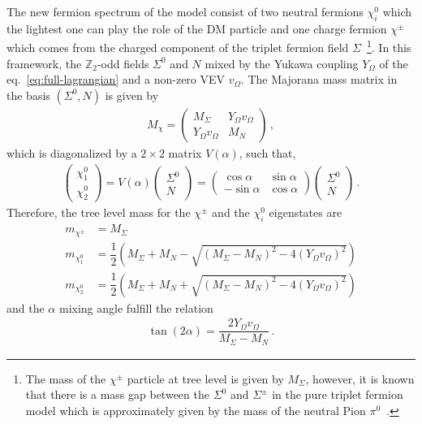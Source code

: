\documentclass[12pt,letterpaper]{article}
\begin{document}
The new fermion spectrum of the model consist of two neutral fermions $\chi_i^0$ which the lightest one can play the role of the DM particle and one charge fermion $\chi^{\pm}$ which comes from the charged component of the triplet fermion field $\Sigma$~\footnote{The mass of the $\chi^{\pm}$ particle at tree level is given by $M_{\Sigma}$, however, it is known that there is a mass gap between the $\Sigma^0$ and $\Sigma^{\pm}$ in the pure triplet fermion model which is approximately given by the mass of the neutral Pion $\pi^0$~\cite{Cirelli:2005uq, Choubey:2017yyn}.}. 
In this framework, the $\mathbb{Z}_2$-odd fields $\Sigma^0$ and $N$ mixed by the Yukawa coupling $Y_{\Omega}$ of the eq.~\ref{eq:full-lagrangian} and a non-zero VEV $v_{\Omega}$. The Majorana mass matrix in the basis $(\Sigma^0, N)$ is given by
\begin{align}
\label{eq:M-chi-matrix}
M_{\chi}=
\begin{pmatrix}
M_{\Sigma} & Y_{\Omega}v_{\Omega} \\
Y_{\Omega}v_{\Omega} & M_N
\end{pmatrix}\,,
\end{align}
which is diagonalized by a $2\times2$ matrix $V(\alpha)$, such that,
\begin{align}
\label{eq:M-chi-rotation}
\begin{pmatrix}
\chi_1^0 \\
\chi_2^0
\end{pmatrix}=
V(\alpha)
\begin{pmatrix}
\Sigma^0 \\
N
\end{pmatrix}
=
\begin{pmatrix}
\cos\alpha & \sin\alpha \\
-\sin\alpha & \cos\alpha
\end{pmatrix}
\begin{pmatrix}
\Sigma^0 \\
N
\end{pmatrix}\,.
\end{align}
Therefore, the tree level mass for the $\chi^{\pm}$ and the $\chi^0_i$ eigenstates are
\begin{align}
m_{\chi^{\pm}} &= M_\Sigma \nonumber \\
m_{\chi_1^0} &= \dfrac{1}{2}\left(M_\Sigma + M_N - \sqrt{(M_\Sigma - M_N)^2-4(Y_{\Omega}v_{\Omega})^2} \right)\nonumber \\
\label{eq:chi-masses}
m_{\chi_2^0} &= \dfrac{1}{2}\left(M_\Sigma + M_N + \sqrt{(M_\Sigma - M_N)^2-4(Y_{\Omega}v_{\Omega})^2} \right)
\end{align}
and the $\alpha$ mixing angle fulfill the relation
\begin{align}
\label{eq:tan-alpha}
\tan(2\alpha)= \dfrac{2Y_{\Omega}v_\Omega}{M_{\Sigma}-M_N}\,.
\end{align}
\end{document}
